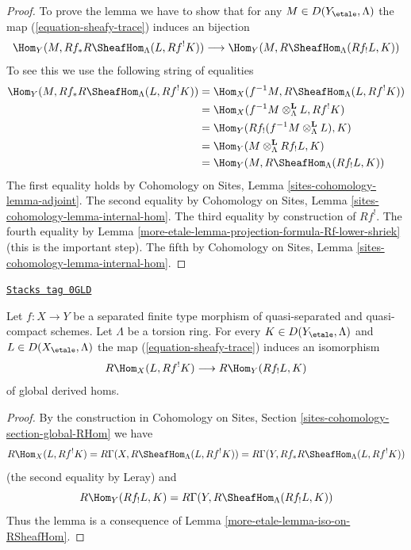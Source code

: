 \begin{proof}
To prove the lemma we have to show that for any $M \in D(Y_\etale, \Lambda)$
the map (\ref{equation-sheafy-trace}) induces an bijection
$$
\Hom_Y(M, Rf_*R\SheafHom_\Lambda(L, Rf^!K))
\longrightarrow
\Hom_Y(M, R\SheafHom_\Lambda(Rf_!L, K))
$$
To see this we use the following string of equalities
\begin{align*}
\Hom_Y(M, Rf_*R\SheafHom_\Lambda(L, Rf^!K))
& =
\Hom_X(f^{-1}M, R\SheafHom_\Lambda(L, Rf^!K)) \\
& =
\Hom_X(f^{-1}M \otimes_\Lambda^\mathbf{L} L, Rf^!K) \\
& =
\Hom_Y(Rf_!(f^{-1}M \otimes_\Lambda^\mathbf{L} L), K) \\
& =
\Hom_Y(M \otimes_\Lambda^\mathbf{L} Rf_!L, K) \\
& =
\Hom_Y(M, R\SheafHom_\Lambda(Rf_!L, K))
\end{align*}
The first equality holds by
Cohomology on Sites, Lemma \ref{sites-cohomology-lemma-adjoint}.
The second equality by
Cohomology on Sites, Lemma \ref{sites-cohomology-lemma-internal-hom}.
The third equality by construction of $Rf^!$.
The fourth equality by Lemma \ref{more-etale-lemma-projection-formula-Rf-lower-shriek}
(this is the important step).
The fifth by
Cohomology on Sites, Lemma \ref{sites-cohomology-lemma-internal-hom}.
\end{proof}

\begin{lemma}
\label{more-etale-lemma-iso-global-hom}
\href{https://stacks.math.columbia.edu/tag/0GLD}{\texttt{Stacks tag 0GLD}}

Let $f : X \to Y$ be a separated finite type morphism of
quasi-separated and quasi-compact schemes. Let $\Lambda$ be a torsion ring.
For every $K \in D(Y_\etale, \Lambda)$ and $L \in D(X_\etale, \Lambda)$ the map
(\ref{equation-sheafy-trace}) induces an isomorphism
$$
R\Hom_X(L, Rf^!K) \longrightarrow R\Hom_Y(Rf_!L, K)
$$
of global derived homs.
\end{lemma}

\begin{proof}
By the construction in
Cohomology on Sites, Section \ref{sites-cohomology-section-global-RHom}
we have
$$
R\Hom_X(L, Rf^!K) =
R\Gamma(X, R\SheafHom_\Lambda(L, Rf^!K)) =
R\Gamma(Y, Rf_*R\SheafHom_\Lambda(L, Rf^!K))
$$
(the second equality by Leray) and
$$
R\Hom_Y(Rf_!L, K) = R\Gamma(Y, R\SheafHom_\Lambda(Rf_!L, K))
$$
Thus the lemma is a consequence of Lemma \ref{more-etale-lemma-iso-on-RSheafHom}.
\end{proof}

